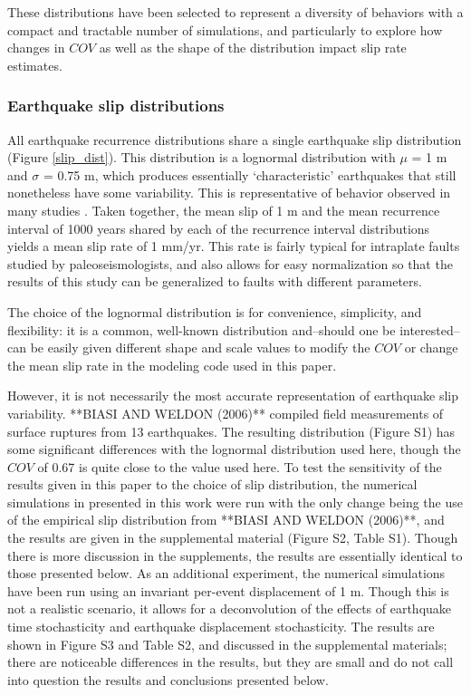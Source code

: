 \documentclass[se, manuscript]{copernicus}
\begin{document}
These distributions have been selected to represent a diversity of
behaviors with a compact and tractable number of simulations, and
particularly to explore how changes in \(COV\) as well as the shape of
the distribution impact slip rate estimates.

\subsubsection{Earthquake slip
distributions}\label{earthquake-slip-distributions}

All earthquake recurrence distributions share a single earthquake slip
distribution (Figure \ref{slip_dist}). This distribution is a lognormal
distribution with \(\mu\) = 1 m and \(\sigma\) = 0.75 m, which produces
essentially `characteristic' earthquakes that still nonetheless have
some variability. This is representative of behavior observed in many
studies \citep[e.g.]{zielke_slip_2010, klinger_characteristic_2011,
  zielke_earthquake_2018}. Taken together, the mean slip of 1 m and the
mean recurrence interval of 1000 years shared by each of the recurrence
interval distributions yields a mean slip rate of 1 mm/yr. This rate is
fairly typical for intraplate faults studied by paleoseismologists, and
also allows for easy normalization so that the results of this study can
be generalized to faults with different parameters.

The choice of the lognormal distribution is for convenience, simplicity, and
flexibility: it is a common, well-known distribution and--should one be
interested--can be easily given different shape and scale values to modify the
\(COV\) or change the mean slip rate in the modeling code used in this paper.

However, it is not necessarily the most accurate representation of earthquake
slip variability. **BIASI AND WELDON (2006)** compiled field measurements of
surface ruptures from 13 earthquakes. The resulting distribution (Figure S1) has
some significant differences with the lognormal distribution used here, though
the \(COV\) of 0.67 is quite close to the value used here. To test the
sensitivity of the results given in this paper to the choice of slip
distribution, the numerical simulations in presented in this work were run with
the only change being the use of the empirical slip distribution from **BIASI
AND WELDON (2006)**, and the results are given in the supplemental material
(Figure S2, Table S1). Though there is more discussion in the supplements, the
results are essentially identical to those presented below. As an additional
experiment, the numerical simulations have been run using an invariant per-event
displacement of 1 m. Though this is not a realistic scenario, it allows for a
deconvolution of the effects of earthquake time stochasticity and earthquake
displacement stochasticity. The results are shown in Figure S3 and Table S2, and
discussed in the supplemental materials; there are noticeable differences in the
results, but they are small and do not call into question the results and
conclusions presented below.
\end{document}
